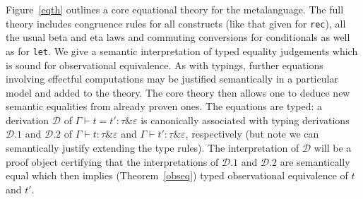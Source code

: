 \documentclass[orivec]{llncs}
\renewcommand{\paragraph}[1]{\noindent {\bf #1}}
\newcommand{\eff}{\varepsilon}
\newcommand{\ety}[2]{{#1}\mathrel{\&}{#2}}
\begin{document}
\paragraph{Equations} Figure~\ref{eqth} outlines a core equational theory for
the metalanguage.  The full theory includes congruence rules for all
constructs (like that given for \texttt{rec}), all the usual beta and
eta laws and commuting conversions for conditionals as well as for
\texttt{let}.
We give
a semantic interpretation of typed equality judgements which is sound
for observational equivalence. 
As with typings, further equations involving effectful computations may be
justified semantically in a particular model and added to the theory.
The core theory then allows one to
deduce new semantic equalities from already proven ones. 
The equations are typed: a derivation
$\mathcal{D}$ of $\Gamma\vdash t=t':\ety{\tau}{\eff}$ is canonically
associated with typing derivations $\mathcal{D}.1$ and $\mathcal{D}.2$
of $\Gamma\vdash t:\ety{\tau}{\eff}$ and $\Gamma\vdash t':
\ety{\tau}{\eff}$,
respectively (but note we can semantically justify extending the
type rules). The interpretation of
$\mathcal{D}$ will be a proof object certifying that the 
interpretations of $\mathcal{D}.1$ and $\mathcal{D}.2$ are
semantically equal which then implies (Theorem~\ref{obseq}) typed
observational equivalence of $t$ and $t'$.
\end{document}
